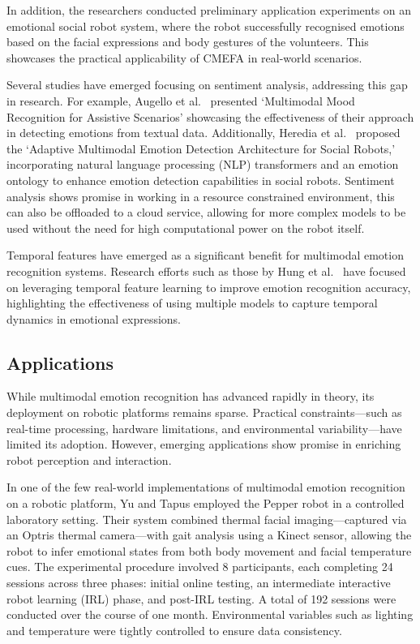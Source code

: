 In addition, the researchers conducted preliminary application experiments on an emotional social robot system, where the robot successfully recognised emotions based on the facial expressions and body gestures of the volunteers. This showcases the practical applicability of CMEFA in real-world scenarios.

Several studies have emerged focusing on sentiment analysis, addressing this gap in research. For example, Augello et al.\ \cite{Augello2022-zy} presented `Multimodal Mood Recognition for Assistive Scenarios' showcasing the effectiveness of their approach in detecting emotions from textual data. Additionally, Heredia et al.\ \cite{Heredia2022-dt} proposed the `Adaptive Multimodal Emotion Detection Architecture for Social Robots,' incorporating natural language processing (NLP) transformers and an emotion ontology to enhance emotion detection capabilities in social robots. Sentiment analysis shows promise in working in a resource constrained environment, this can also be offloaded to a cloud service, allowing for more complex models to be used without the need for high computational power on the robot itself.

Temporal features have emerged as a significant benefit for multimodal emotion recognition systems. Research efforts such as those by Hung et al.\ \cite{Hung2020-gm} have focused on leveraging temporal feature learning to improve emotion recognition accuracy, highlighting the effectiveness of using multiple models to capture temporal dynamics in emotional expressions.

\subsection{Applications}

While multimodal emotion recognition has advanced rapidly in theory, its deployment on robotic platforms remains sparse. Practical constraints—such as real-time processing, hardware limitations, and environmental variability—have limited its adoption. However, emerging applications show promise in enriching robot perception and interaction.

In one of the few real-world implementations of multimodal emotion recognition on a robotic platform, Yu and Tapus \cite{Yu2019-ku} employed the Pepper robot in a controlled laboratory setting. Their system combined thermal facial imaging—captured via an Optris thermal camera—with gait analysis using a Kinect sensor, allowing the robot to infer emotional states from both body movement and facial temperature cues. The experimental procedure involved 8 participants, each completing 24 sessions across three phases: initial online testing, an intermediate interactive robot learning (IRL) phase, and post-IRL testing. A total of 192 sessions were conducted over the course of one month. Environmental variables such as lighting and temperature were tightly controlled to ensure data consistency.

